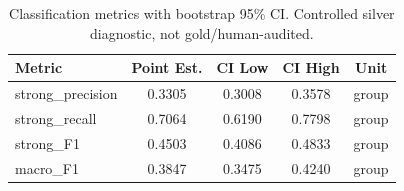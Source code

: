 \begin{table}[ht]
\centering
\caption{Classification metrics with bootstrap 95\% CI. Controlled silver diagnostic, not gold/human-audited.}
\label{tab:review_queue}
\begin{tabular}{lcccc}
\toprule
Metric & Point Est. & CI Low & CI High & Unit \\
\midrule
strong_precision & 0.3305 & 0.3008 & 0.3578 & group \\
strong_recall & 0.7064 & 0.6190 & 0.7798 & group \\
strong_F1 & 0.4503 & 0.4086 & 0.4833 & group \\
macro_F1 & 0.3847 & 0.3475 & 0.4240 & group \\
\bottomrule
\end{tabular}
\end{table}